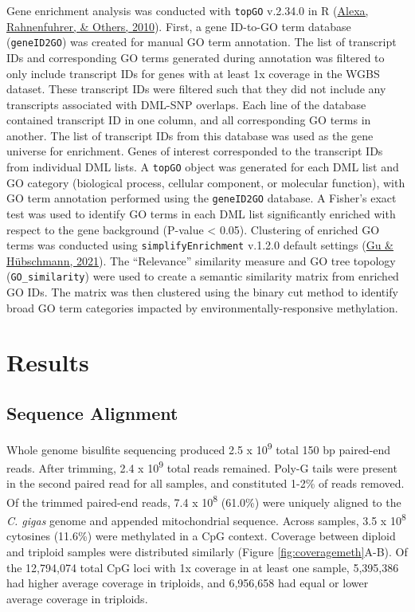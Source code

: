 \documentclass [11pt, proquest] {uwthesis}[2015/03/03]
\begin{document}
Gene enrichment analysis was conducted with \texttt{topGO} v.2.34.0 in R (\protect\hyperlink{ref-Alexa2010}{Alexa, Rahnenfuhrer, \& Others, 2010}). First, a gene ID-to-GO term database (\texttt{geneID2GO}) was created for manual GO term annotation. The list of transcript IDs and corresponding GO terms generated during annotation was filtered to only include transcript IDs for genes with at least 1x coverage in the WGBS dataset. These transcript IDs were filtered such that they did not include any transcripts associated with DML-SNP overlaps. Each line of the database contained transcript ID in one column, and all corresponding GO terms in another. The list of transcript IDs from this database was used as the gene universe for enrichment. Genes of interest corresponded to the transcript IDs from individual DML lists. A \texttt{topGO} object was generated for each DML list and GO category (biological process, cellular component, or molecular function), with GO term annotation performed using the \texttt{geneID2GO} database. A Fisher's exact test was used to identify GO terms in each DML list significantly enriched with respect to the gene background (P-value \textless{} 0.05). Clustering of enriched GO terms was conducted using \texttt{simplifyEnrichment} v.1.2.0 default settings (\protect\hyperlink{ref-Gu2021}{Gu \& Hübschmann, 2021}). The ``Relevance'' similarity measure and GO tree topology (\texttt{GO\_similarity}) were used to create a semantic similarity matrix from enriched GO IDs. The matrix was then clustered using the binary cut method to identify broad GO term categories impacted by environmentally-responsive methylation.

\hypertarget{results-3}{%
\section{Results}\label{results-3}}

\hypertarget{sequence-alignment-3}{%
\subsection{Sequence Alignment}\label{sequence-alignment-3}}

Whole genome bisulfite sequencing produced 2.5 x 10\textsuperscript{9} total 150 bp paired-end reads. After trimming, 2.4 x 10\textsuperscript{9} total reads remained. Poly-G tails were present in the second paired read for all samples, and constituted 1-2\% of reads removed. Of the trimmed paired-end reads, 7.4 x 10\textsuperscript{8} (61.0\%) were uniquely aligned to the \emph{C. gigas} genome and appended mitochondrial sequence. Across samples, 3.5 x 10\textsuperscript{8} cytosines (11.6\%) were methylated in a CpG context. Coverage between diploid and triploid samples were distributed similarly (Figure \ref{fig:coveragemeth}A-B). Of the 12,794,074 total CpG loci with 1x coverage in at least one sample, 5,395,386 had higher average coverage in triploids, and 6,956,658 had equal or lower average coverage in triploids.
\end{document}
